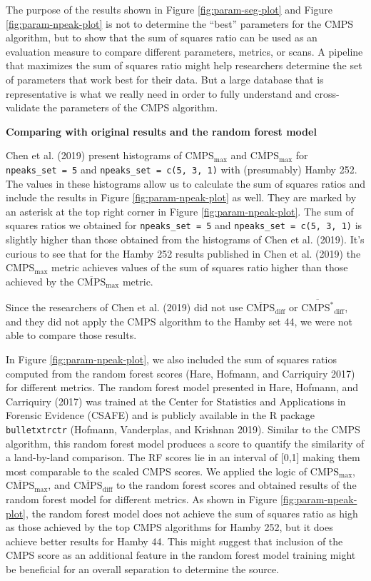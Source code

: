 The purpose of the results shown in Figure \ref{fig:param-seg-plot} and Figure \ref{fig:param-npeak-plot} is not to determine the ``best'' parameters for the CMPS algorithm, but to show that the sum of squares ratio can be used as an evaluation measure to compare different parameters, metrics, or scans.
A pipeline that maximizes the sum of squares ratio might help researchers determine the set of parameters that work best for their data.
But a large database that is representative is what we really need in order to fully understand and cross-validate the parameters of the CMPS algorithm.

\textbf{Comparing with original results and the random forest model}

Chen et al. (2019) present histograms of \(\mathrm{CMPS_{max}}\) and \(\mathrm{\overline{CMPS}_{max}}\) for \texttt{npeaks\_set\ =\ 5} and \texttt{npeaks\_set\ =\ c(5,\ 3,\ 1)} with (presumably) Hamby 252.
The values in these histograms allow us to calculate the sum of squares ratios and include the results in Figure \ref{fig:param-npeak-plot} as well.
They are marked by an asterisk at the top right corner in Figure \ref{fig:param-npeak-plot}.
The sum of squares ratios we obtained for \texttt{npeaks\_set\ =\ 5} and \texttt{npeaks\_set\ =\ c(5,\ 3,\ 1)} is slightly higher than those obtained from the histograms of Chen et al. (2019).
It's curious to see that for the Hamby 252 results published in Chen et al. (2019) the \(\mathrm{{CMPS}_{max}}\) metric achieves values of the sum of squares ratio higher than those achieved by the \(\mathrm{\overline{CMPS}_{max}}\) metric.

Since the researchers of Chen et al. (2019) did not use \(\mathrm{\overline{CMPS}_{diff}}\) or \(\mathrm{\overline{CMPS^*}_{diff}}\), and they did not apply the CMPS algorithm to the Hamby set 44, we were not able to compare those results.

In Figure \ref{fig:param-npeak-plot}, we also included the sum of squares ratios computed from the random forest scores (Hare, Hofmann, and Carriquiry 2017) for different metrics.
The random forest model presented in Hare, Hofmann, and Carriquiry (2017) was trained at the Center for Statistics and Applications in Forensic Evidence (CSAFE) and is publicly available in the R package \texttt{bulletxtrctr} (Hofmann, Vanderplas, and Krishnan 2019).
Similar to the CMPS algorithm, this random forest model produces a score to quantify the similarity of a land-by-land comparison.
The RF scores lie in an interval of {[}0,1{]} making them most comparable to the scaled CMPS scores.
We applied the logic of \(\mathrm{{CMPS}_{max}}\), \(\mathrm{\overline{CMPS}_{max}}\), and \(\mathrm{\overline{CMPS}_{diff}}\) to the random forest scores and obtained results of the random forest model for different metrics.
As shown in Figure \ref{fig:param-npeak-plot}, the random forest model does not achieve the sum of squares ratio as high as those achieved by the top CMPS algorithms for Hamby 252, but it does achieve better results for Hamby 44.
This might suggest that inclusion of the CMPS score as an additional feature in the random forest model training might be beneficial for an overall separation to determine the source.

